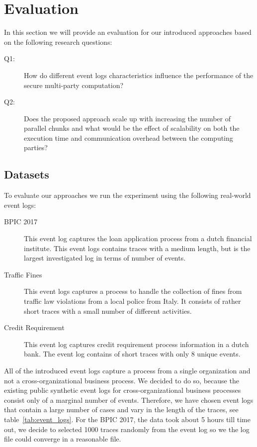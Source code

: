 \section{Evaluation}
\label{sec:evaluation}
In this section we will provide an  evaluation for our introduced approaches based on the following research questions:
 \begin{description}
 	\item[Q1:] How do different event logs characteristics influence the performance of the secure multi-party computation?
 \item[Q2:] Does the proposed approach scale up with increasing the number of parallel chunks and what would be the effect of scalability on both the execution time and communication overhead between the computing parties?
\end{description}


\subsection{Datasets}
\label{sec:data}
To evaluate our approaches we run the experiment using the following real-world event logs:
\begin{description}
	\item[BPIC 2017] This event log captures the loan application process from a dutch financial institute. This event logs contains traces with a medium length, but is the largest investigated log in terms of number of events.
	\item[Traffic Fines] This event logs captures a process to handle the collection of fines from traffic law violations from a local police from Italy. It consists of rather short traces with a small number of different activities.
		\item[Credit Requirement] This event log captures credit requirement process information in a dutch bank. The event log contains of short traces with only 8 unique events.
\end{description}
All of the introduced event logs capture a process from a single organization and not a cross-organizational business process. We decided to do so, because the existing public synthetic event logs\cite{borkowski2017event} for cross-organizational business processes consist only of a marginal number of events. Therefore, we have chosen event logs that contain a large number of cases and vary in the length of the traces, see table~\ref{tab:event_logs}. For the BPIC 2017, the data took about 5 hours till time out, we decide to selected 1000 traces randomly from the event log so we the log file could converge in a reasonable file.

